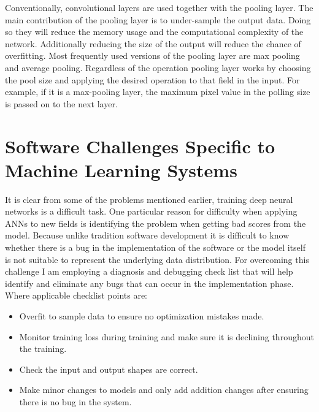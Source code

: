 Conventionally, convolutional layers are used together with the pooling layer.
The main contribution of the pooling layer is to under-sample the output data.
Doing so they will reduce the memory usage and the computational complexity of the network.
Additionally reducing the size of the output will reduce the chance of overfitting.
Most frequently used versions of the pooling layer are max pooling and average pooling.
Regardless of the operation pooling layer works by choosing the pool size and applying the desired operation to that field in the input.
For example, if it is a max-pooling layer, the maximum pixel value in the polling size is passed on to the next layer.


\section{Software Challenges Specific to 
Machine Learning Systems} \label{sec:engchallenge}
It is clear from some of the problems mentioned earlier, training deep neural networks is a difficult task. 
One particular reason for difficulty when applying ANNs to new fields is identifying the problem when getting bad scores from the model. 
Because unlike tradition software development it is difficult to know whether there is a bug in the implementation of the software or the model itself is not suitable to represent the underlying data distribution.
For overcoming this challenge I am employing a diagnosis and debugging check list that will help identify and eliminate any bugs that can occur in the implementation phase.
Where applicable checklist points are:

\begin{itemize}
  \item Overfit to sample data to ensure no optimization mistakes made.
  \item Monitor training loss during training and make sure it is declining throughout the training.
  \item Check the input and output shapes are correct.
  \item Make minor changes to models and only add addition changes after ensuring there is no bug in the system.
\end{itemize}

